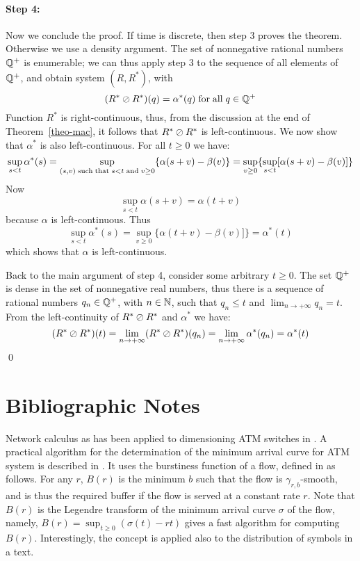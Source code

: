 \paragraph{Step 4:} Now we conclude the proof. If time is
discrete, then step 3 proves the theorem. Otherwise we use a
density argument. The set of nonnegative rational numbers
$\mathbb{Q}^+$ is enumerable; we can thus apply step 3 to the sequence
of all elements of $\mathbb{Q}^+$, and obtain system $(R,R^*)$, with
 $$
 (R^* \oslash R^*)(q)= \alpha^*(q) \mathrm{\; for \; all \; } q \in \mathbb{Q}^+
 $$
Function $R^*$ is right-continuous, thus, from the discussion at
the end of Theorem~\ref{theo-mac}, it follows that $R^* \oslash R^*$
is left-continuous. We now show that $\alpha^*$ is also
left-continuous. For all $t \geq 0$ we have:
 $$
 \sup_{s < t} \alpha^*(s) =
 \sup_{(s,v) \mathrm{\; such \; that \; } s < t \mathrm{\; and \; } v \geq 0} \{ \alpha(s+v) -\beta(v)\}
 =
 \sup_{v \geq 0} \{
   \sup_{s < t} [\alpha(s+v) -\beta(v)]\}
 $$
Now
 $$\sup_{s < t} \alpha(s+v)= \alpha(t+v)$$
because $\alpha$ is left-continuous. Thus
 $$
  \sup_{s < t} \alpha^*(s)= \sup_{v \geq 0} \{
   \alpha(t+v) -\beta(v)]\} =  \alpha^*(t)
 $$
which shows that $\alpha$ is left-continuous.

Back to the main argument of step 4, consider some arbitrary $t
\geq 0$. The set $\mathbb{Q}^+$ is dense in the set of nonnegative real
numbers, thus there is a sequence of rational numbers $q_n \in
\mathbb{Q}^+$, with $n \in \mathbb{N}$, such that $q_n \leq t$ and $\lim_{n
\rightarrow +\infty }q_n = t$. From the left-continuity of $R^*
\oslash R^*$ and $\alpha^*$ we have:
 $$
 (R^* \oslash R^*)(t)=
 \lim_{n\rightarrow +\infty }(R^* \oslash R^*)(q_n)=
 \lim_{n\rightarrow +\infty }\alpha^*(q_n)= \alpha^*(t)
 $$
 \qed

\section{Bibliographic Notes}

Network calculus as has been applied to dimensioning ATM switches
in \cite{naudts96}. A practical algorithm for the determination of
the minimum arrival curve for ATM system is described in
\cite{naudts99}. It uses the burstiness function of a flow,
defined in \cite{LV91} as  follows. For any $r$, $B(r)$ is the
minimum $b$ such that the flow is $\gamma_{r,b}$-smooth, and is
thus the required buffer if the flow is served at a constant rate
$r$. Note that $B(r)$ is the Legendre transform of the minimum
arrival curve $\sigma$ of the flow, namely, $B(r)= \sup_{t \geq
0}(\sigma(t)-rt)$ \cite{naudts99} gives a fast algorithm for
computing $B(r)$. Interestingly, the concept is applied also to
the distribution of symbols in a text.


